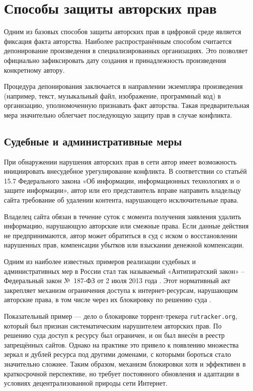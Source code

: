\section{Способы защиты авторских прав}

Одним из базовых способов защиты авторских прав в цифровой среде является фиксация
факта авторства. Наиболее распространённым способом считается депонирование произведения
в специализированных организациях. Это позволяет официально зафиксировать дату создания
и принадлежность произведения конкретному автору.

Процедура депонирования заключается в направлении экземпляра произведения (например,
текст, музыкальный файл, изображение, программный код) в организацию, уполномоченную
признавать факт авторства. Такая предварительная мера значительно облегчает последующую
защиту прав в случае конфликта.

\subsection{Судебные и административные меры}

При обнаружении нарушения авторских прав в сети автор имеет возможность инициировать
внесудебное урегулирование конфликта. В соответствии со статьёй 15.7 Федерального закона
«Об информации, информационных технологиях и о защите информации», автор или его
представитель вправе направить владельцу сайта требование об удалении контента,
нарушающего исключительные права.

Владелец сайта обязан в течение суток с момента получения заявления удалить информацию,
нарушающую авторские или смежные права. Если данные действия не предпринимаются, автор
может обратиться в суд с иском о восстановлении нарушенных прав, компенсации убытков
или взыскании денежной компенсации.

Одним из наиболее известных примеров реализации судебных и административных мер в России
стал так называемый «Антипиратский закон» -- Федеральный закон №~187-ФЗ от 2 июля 2013
года \cite{FZ187}. Этот нормативный акт закрепляет механизм ограничения доступа к интернет-ресурсам,
нарушающим авторские права, в том числе через их блокировку по решению суда \cite{Nikitin2018}.

Показательный пример — дело о блокировке торрент-трекера \texttt{rutracker.org}, который
был признан систематическим нарушителем авторских прав. По решению суда доступ к ресурсу
был ограничен, и он был внесён в реестр запрещённых сайтов. Однако на практике это
привело к появлению множества зеркал и дублей ресурса под другими доменами, с которыми
бороться стало значительно сложнее. Таким образом, механизм блокировки хотя и эффективен
в краткосрочной перспективе, но требует постоянного обновления и адаптации в условиях
децентрализованной природы сети Интернет.

